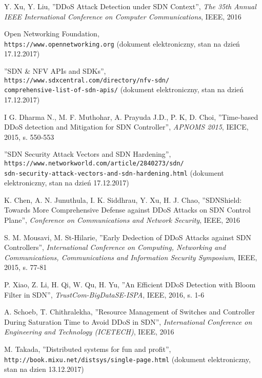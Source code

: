 \begin{thebibliography}{99}
Y. Xu, Y. Liu,
''DDoS Attack Detection under SDN Context'',
\textit{The 35th Annual IEEE International Conference on Computer
  Communications}, 
IEEE, 2016

Open Networking Foundation,
\\\texttt{https://www.opennetworking.org} (dokument elektroniczny, stan
na dzień 17.12.2017)

''SDN \& NFV APIs and SDKs'',
\\\texttt{https://www.sdxcentral.com/directory/nfv-sdn/
  \\comprehensive-list-of-sdn-apis/}
(dokument elektroniczny, stan na dzień 17.12.2017)

I G. Dharma N., M. F. Muthohar, A. Prayuda J.D., P. K, D. Choi,
''Time-based DDoS detection and Mitigation for SDN Controller'',
\textit{APNOMS 2015}, 
IEICE, 2015, s. 550-553

''SDN Security Attack Vectors and SDN Hardening'',
\\\texttt{https://www.networkworld.com/article/2840273/sdn/
  \\sdn-security-attack-vectors-and-sdn-hardening.html}
(dokument elektroniczny, stan na dzień 17.12.2017) 

K. Chen, A. N. Junuthula, I. K. Siddhrau, Y. Xu, H. J. Chao,
''SDNShield: Towards More Comprehensive Defense against DDoS Attacks on SDN
Control Plane'', 
\textit{Conference on Communications and Network Security},
IEEE, 2016

S. M. Mousavi, M. St-Hilarie,
''Early Dedection of DDoS Attacks against SDN Controllers'',
\textit{International Conference on Computing, Networking and Communications,
  Communications and Information Security Symposium},
IEEE, 2015, s. 77-81

P. Xiao, Z. Li, H. Qi, W. Qu, H. Yu,
''An Efficient DDoS Detection with Bloom Filter in SDN'',
\textit{TrustCom-BigDataSE-ISPA},
IEEE, 2016, s. 1-6

A. Schoeb, T. Chithralekha,
''Resource Management of Switches and Controller During Saturation Time to Avoid
DDoS in SDN'',
\textit{International Conference on Engineering and Technology (ICETECH)},
IEEE, 2016

M. Takada,
''Distributed systems for fun and profit'',
\\\texttt{http://book.mixu.net/distsys/single-page.html} (dokument
elektroniczny, stan na dzien 13.12.2017)


\end{thebibliography}
